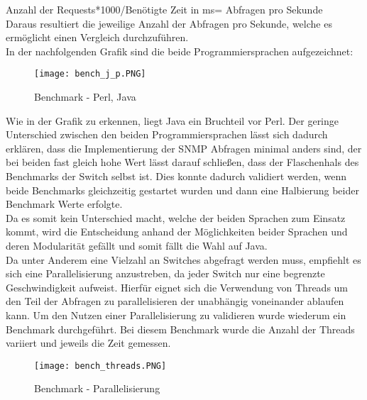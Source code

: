 Anzahl der Requests*1000/Benötigte Zeit in ms= Abfragen pro Sekunde\\

Daraus resultiert die jeweilige Anzahl der Abfragen pro Sekunde, welche es ermöglicht einen Vergleich durchzuführen.\\

In der nachfolgenden Grafik sind die beide Programmiersprachen aufgezeichnet:\\

\begin{figure}[H]
\centering
\texttt{[image: bench\_j\_p.PNG]}
\caption{Benchmark - Perl, Java}
\label{fig:benchperljava}
\end{figure}

Wie in der Grafik zu erkennen, liegt Java ein Bruchteil vor Perl. Der geringe Unterschied zwischen den beiden Programmiersprachen lässt sich dadurch erklären, dass die Implementierung der SNMP Abfragen minimal anders sind, der bei beiden fast gleich hohe Wert lässt darauf schließen, dass der Flaschenhals des Benchmarks der Switch selbst ist. Dies konnte dadurch validiert werden, wenn beide Benchmarks  gleichzeitig gestartet wurden und dann eine Halbierung beider Benchmark Werte erfolgte.\\
Da es somit kein Unterschied macht, welche der beiden Sprachen zum Einsatz kommt, wird die Entscheidung anhand der Möglichkeiten beider Sprachen und deren Modularität gefällt und somit fällt die Wahl auf Java.\\

Da unter Anderem eine Vielzahl an Switches abgefragt werden muss, empfiehlt es sich eine Parallelisierung anzustreben, da jeder Switch nur eine begrenzte Geschwindigkeit aufweist.
Hierfür eignet sich die Verwendung von Threads um den Teil der Abfragen zu parallelisieren der unabhängig voneinander ablaufen kann. Um den Nutzen einer Parallelisierung zu validieren wurde wiederum ein Benchmark durchgeführt. Bei diesem Benchmark wurde die Anzahl der Threads variiert und jeweils die Zeit gemessen.\\

\begin{figure}[H]
\centering
\texttt{[image: bench\_threads.PNG]}
\caption{Benchmark - Parallelisierung}
\label{fig:benchparallel}
\end{figure}

